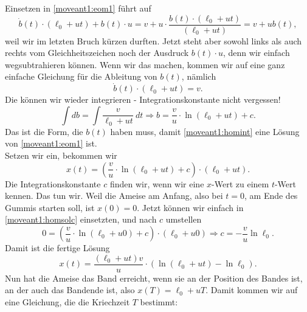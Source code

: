 \begin{Answer}[ref = moveant]
	Einsetzen in \eqref{moveant1:eom1} führt auf
	\begin{equation}\label{moveant1:homsub}
		\dot{b}\left(t\right) \cdot \left(\ell_0 + u t\right)  + b\left(t\right)  \cdot u = v + u\cdot \frac{b\left(t\right) \cdot \left(\ell_0 + u t\right)}{ \left(\ell_0 + u t\right)} = v + u b\left(t\right),
	\end{equation}
	weil wir im letzten Bruch kürzen durften. Jetzt steht aber sowohl links als auch rechts vom Gleichheitszeichen noch der Ausdruck $b\left(t\right)\cdot u$, denn wir einfach wegsubtrahieren können. Wenn wir das machen, kommen wir auf eine ganz einfache Gleichung für die Ableitung von $b\left(t\right)$, nämlich
	\begin{equation*}
		\dot{b}\left(t\right)\cdot \left(\ell_0 + u t\right) = v.
	\end{equation*}
	Die können wir wieder integrieren - Integrationskonstante nicht vergessen!
	\begin{equation}
	\int db = \int \frac{v}{\ell_0 + u t}~dt \Rightarrow b = \frac{v}{u}\cdot \ln \left(\ell_0 + u t\right)+c.
	\end{equation}
	Das ist die Form, die $b\left(t\right)$ haben muss, damit \eqref{moveant1:homint} eine Lösung von \eqref{moveant1:eom1} ist.\\
	Setzen wir ein, bekommen wir
	\begin{equation}\label{moveant1:homsolc}
		x\left(t\right) = \left( \frac{v}{u}\cdot \ln \left(\ell_0 + u t\right)+c\right) \cdot \left(\ell_0 + ut\right).
	\end{equation}
	Die Integrationskonstante $c$ finden wir, wenn wir eine $x$-Wert zu einem $t$-Wert kennen. Das tun wir. Weil die Ameise am Anfang, also bei $t=0$, am Ende des Gummis starten soll, ist $x\left(0\right) = 0$. Jetzt können wir einfach in \eqref{moveant1:homsolc} einsetzten, und nach $c$ umstellen
	\begin{equation*}
		0 = \left( \frac{v}{u}\cdot \ln \left(\ell_0 + u 0\right)+c\right) \cdot \left(\ell_0 + u 0\right) \Rightarrow c = - \frac{v}{u}\ln \ell_0.
	\end{equation*}
	Damit ist die fertige Lösung
	\begin{equation}
		x\left(t\right) = \frac{\left(\ell_0 + u t\right)v}{u}\cdot \left(\ln\left(\ell_0 + u t\right) - \ln \ell_0\right).
	\end{equation}
	Nun hat die Ameise das Band erreicht, wenn sie an der Position des Bandes ist, an der auch das Bandende ist, also $x\left(T\right) = \ell_0 + u T$. Damit kommen wir auf eine Gleichung, die die Kriechzeit $T$ bestimmt:

\end{Answer}
